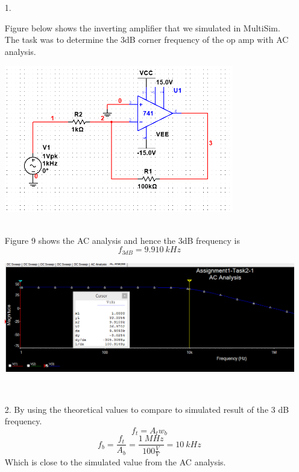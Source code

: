 \documentclass[11pt,a4paper]{article}
\begin{document}
\begin{enumerate}
  \item[1.]
  
  Figure below shows the inverting amplifier that we simulated in MultiSim. The task was to determine the 3dB corner frequency of the op amp with AC analysis.\\
  \begin{minipage}{\linewidth}
  \centering
      \includegraphics[width=10cm]{Task2-1-Circuit}\\
    \end{minipage}\\
Figure 9 shows the AC analysis and hence the 3dB  frequency is
$$ f_{3dB} = 9.910 \ kHz $$
  \begin{minipage}{\linewidth}
  \centering
      \includegraphics[width=14cm]{Task2-1-ACAnalysis}\\
    \end{minipage}\\

  \item[2.]
  By using the theoretical values to compare to simulated result of the 3 dB frequency.
$$f_{t} = A_{t}w_{b}$$
$$ f_{b} = \frac{f_{t}}{A_{b}} = \frac{1\ MHz}{100 \frac{V}{V}} = 10\ kHz $$
Which is close to the simulated value from the AC analysis.  

\end{enumerate}
\pagebreak
\end{document}
